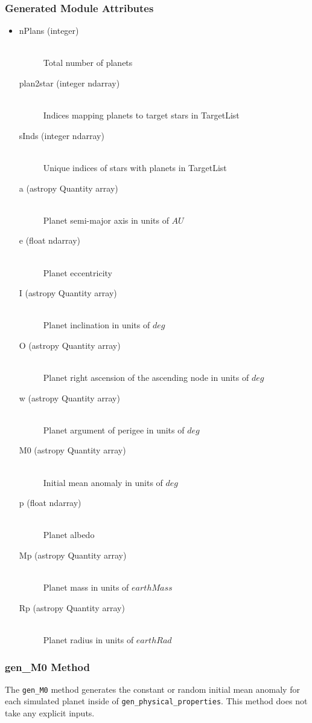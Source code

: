 \documentclass[cleanfoot]{asme2ej}
\begin{document}
\subsubsection*{Generated Module Attributes}
\begin{itemize}
\item 
\begin{description}
    \item[nPlans (integer)] \hfill \\ Total number of planets
    \item[plan2star (integer ndarray)] \hfill \\ Indices mapping planets to target stars in TargetList
    \item[sInds (integer ndarray)] \hfill \\ Unique indices of stars with planets in TargetList
    \item[a (astropy Quantity array)] \hfill \\ Planet semi-major axis in units of $ AU $
    \item[e (float ndarray)] \hfill \\ Planet eccentricity
    \item[I (astropy Quantity array)] \hfill \\ Planet inclination in units of $ deg $
    \item[O (astropy Quantity array)] \hfill \\ Planet right ascension of the ascending node in units of $ deg $
    \item[w (astropy Quantity array)] \hfill \\ Planet argument of perigee in units of $ deg $
    \item[M0 (astropy Quantity array)] \hfill \\ Initial mean anomaly in units of $ deg $
    \item[p (float ndarray)] \hfill \\ Planet albedo
    \item[Mp (astropy Quantity array)] \hfill \\ Planet mass in units of $earthMass$
    \item[Rp (astropy Quantity array)] \hfill \\ Planet radius in units of $earthRad$
\end{description}
\end{itemize}

\subsubsection{gen\_M0 Method} \label{sec:genM0task}
The \verb+gen_M0+ method generates the constant or random initial mean anomaly for each simulated planet inside of \verb+gen_physical_properties+. This method does not take any explicit inputs.
\end{document}
